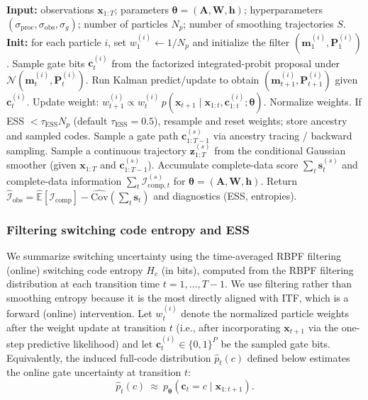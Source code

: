 \documentclass[twoside]{article}
\theoremstyle{plain}
\theoremstyle{definition}
\theoremstyle{remark}
\newcommand{\E}{\mathbb{E}}
\newcommand{\Cov}{\mathrm{Cov}}
\newcommand{\Ic}{\bm{\mathcal{I}}_{\mathrm{comp}}}
\newcommand{\Iohat}{\bm{\widehat{\mathcal{I}}}_{\mathrm{obs}}}
\begin{document}
\begin{algorithm}[t]
\caption{RBPF and Louis estimator of observed information}
\label{alg:rbpf-louis}
\begin{algorithmic}[1]
\STATE \textbf{Input:} observations $\bm{x}_{1:T}$; parameters $\bm\theta=(\bm{A},\bm{W},\bm{h})$; hyperparameters $(\sigma_{\mathrm{proc}},\sigma_{\mathrm{obs}},\sigma_g)$; number of particles $N_p$; number of smoothing trajectories $S$.
\STATE \textbf{Init:} for each particle $i$, set $w_1^{(i)}\leftarrow 1/N_p$ and initialize the filter $(\bm{m}_1^{(i)},\bm{P}_1^{(i)})$.
		\STATE Sample gate bits $\bm{c}_t^{(i)}$ from the factorized integrated-probit proposal under $\mathcal{N}(\bm{m}_t^{(i)},\bm{P}_t^{(i)})$.
		\STATE Run Kalman predict/update to obtain $(\bm{m}_{t+1}^{(i)},\bm{P}_{t+1}^{(i)})$ given $\bm{c}_t^{(i)}$.
		\STATE Update weight: $w_{t+1}^{(i)}\propto w_t^{(i)}\,p(\bm{x}_{t+1}\mid \bm{x}_{1:t},\bm{c}_{1:t}^{(i)};\bm\theta)$.
	\ENDFOR
		\STATE Normalize weights.
		\STATE If ESS $< \tau_{\mathrm{ESS}} N_p$ (default $\tau_{\mathrm{ESS}}=0.5$), resample and reset weights; store ancestry and sampled codes.
\ENDFOR
{}
	\STATE Sample a gate path $\bm{c}_{1:T-1}^{(s)}$ via ancestry tracing / backward sampling.
	\STATE Sample a continuous trajectory $\bm{z}_{1:T}^{(s)}$ from the conditional Gaussian smoother (given $\bm{x}_{1:T}$ and $\bm{c}_{1:T-1}^{(s)}$).
	\STATE Accumulate complete-data score $\sum_t \bm{s}_t^{(s)}$ and complete-data information $\sum_t \bm{\mathcal{I}}_{\mathrm{comp},t}^{(s)}$ for $\bm\theta=(\bm{A},\bm{W},\bm{h})$.
\ENDFOR
\STATE Return $\Iohat=\widehat{\E}[\Ic] - \widehat{\Cov}(\sum_t \bm{s}_t)$ and diagnostics (ESS, entropies).
\end{algorithmic}
\end{algorithm}

\subsubsection{Filtering switching code entropy and ESS}
We summarize switching uncertainty using the time-averaged RBPF filtering (online) switching code entropy $H_c$ (in bits), computed from the RBPF filtering distribution at each transition time $t=1,\dots,T-1$. We use filtering rather than smoothing entropy because it is the most directly aligned with ITF, which is a forward (online) intervention. Let $w_t^{(i)}$ denote the normalized particle weights after the weight update at transition $t$ (i.e., after incorporating $\bm x_{t+1}$ via the one-step predictive likelihood) and let $\bm{c}_t^{(i)}\in\{0,1\}^P$ be the sampled gate bits.
Equivalently, the induced full-code distribution $\hat p_t(c)$ defined below estimates the online gate uncertainty at transition $t$:
\begin{equation}
\hat p_t(c)\ \approx\ p_{\bm\theta}(\bm c_t=c\mid \bm x_{1:t+1}).
\end{equation}
\end{document}
